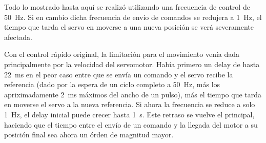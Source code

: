 
Todo lo mostrado hasta aquí se realizó utilizando una frecuencia de control de \qty{50}{\Hz}. Si en cambio dicha frecuencia de envío de comandos se redujera a \qty{1}{\Hz}, el tiempo que tarda el servo en moverse a una nueva posición se verá severamente afectada.

Con el control rápido original, la limitación para el movimiento venía dada principalmente por la velocidad del servomotor. Había primero un delay de hasta \qty{22}{\ms} en el peor caso entre que se envía un comando y el servo recibe la referencia (dado por la espera de un ciclo completo a \qty{50}{\Hz}, más los apriximadamente \qty{2}{\ms} máximos del ancho de un pulso), más el tiempo que tarda en moverse el servo a la nueva referencia. Si ahora la frecuencia se reduce a solo \qty{1}{\Hz}, el delay inicial puede crecer hasta \qty{1}{\s}. Este retraso se vuelve el principal, haciendo que el tiempo entre el envío de un comando y la llegada del motor a su posición final sea ahora un órden de magnitud mayor.

